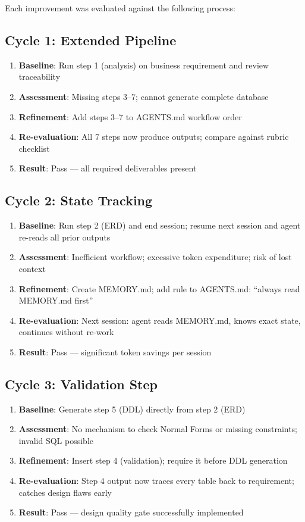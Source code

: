 \documentclass[12pt,a4paper]{article}
\begin{document}
Each improvement was evaluated against the following process:

\subsection{Cycle 1: Extended Pipeline}
\begin{enumerate}
    \item \textbf{Baseline}: Run step 1 (analysis) on business requirement and review traceability
    \item \textbf{Assessment}: Missing steps 3--7; cannot generate complete database
    \item \textbf{Refinement}: Add steps 3--7 to AGENTS.md workflow order
    \item \textbf{Re-evaluation}: All 7 steps now produce outputs; compare against rubric checklist
    \item \textbf{Result}: Pass — all required deliverables present
\end{enumerate}

\subsection{Cycle 2: State Tracking}
\begin{enumerate}
    \item \textbf{Baseline}: Run step 2 (ERD) and end session; resume next session and agent re-reads all prior outputs
    \item \textbf{Assessment}: Inefficient workflow; excessive token expenditure; risk of lost context
    \item \textbf{Refinement}: Create MEMORY.md; add rule to AGENTS.md: ``always read MEMORY.md first''
    \item \textbf{Re-evaluation}: Next session: agent reads MEMORY.md, knows exact state, continues without re-work
    \item \textbf{Result}: Pass — significant token savings per session
\end{enumerate}

\subsection{Cycle 3: Validation Step}
\begin{enumerate}
    \item \textbf{Baseline}: Generate step 5 (DDL) directly from step 2 (ERD)
    \item \textbf{Assessment}: No mechanism to check Normal Forms or missing constraints; invalid SQL possible
    \item \textbf{Refinement}: Insert step 4 (validation); require it before DDL generation
    \item \textbf{Re-evaluation}: Step 4 output now traces every table back to requirement; catches design flaws early
    \item \textbf{Result}: Pass — design quality gate successfully implemented
\end{enumerate}
\end{document}
